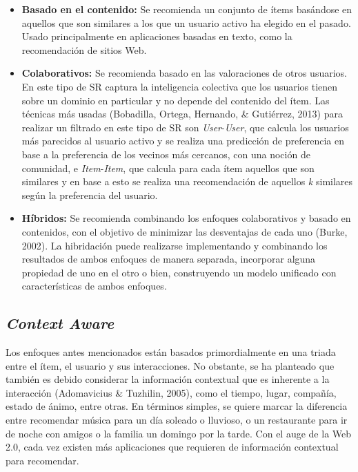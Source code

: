 \begin{itemize}
	\item \textbf{Basado en el contenido:} Se recomienda un conjunto de ítems basándose en aquellos que son similares a los que un usuario activo ha elegido en el pasado. Usado principalmente en aplicaciones basadas en texto, como la recomendación de sitios Web.
	\item \textbf{Colaborativos:} Se recomienda basado en las valoraciones de otros usuarios. En este tipo de SR captura la inteligencia colectiva que los usuarios tienen sobre un dominio en particular y no depende del contenido del ítem. Las técnicas más usadas (Bobadilla, Ortega, Hernando, & Gutiérrez, 2013) para realizar un filtrado en este tipo de SR son \textit{User}-\textit{User}, que calcula los usuarios más parecidos al usuario activo y se realiza una predicción de preferencia en base a la preferencia de los vecinos más cercanos, con una noción de comunidad, e \textit{Item}-\textit{Item}, que calcula para cada ítem aquellos que son similares y en base a esto se realiza una recomendación de aquellos \textit{k} similares según la preferencia del usuario.
	\item \textbf{Híbridos:} Se recomienda combinando los enfoques colaborativos y basado en contenidos, con el objetivo de minimizar las desventajas de cada uno (Burke, 2002). La hibridación puede realizarse implementando y combinando los resultados de ambos enfoques de manera separada, incorporar alguna propiedad de uno en el otro o bien, construyendo un modelo unificado con características de ambos enfoques.
\end{itemize}

\subsection{\textit{Context Aware}}

Los enfoques antes mencionados están basados primordialmente en una triada entre el ítem, el usuario y sus interacciones. No obstante, se ha planteado que también es debido considerar la información contextual que es inherente a la interacción (Adomavicius & Tuzhilin, 2005), como el tiempo, lugar, compañía, estado de ánimo, entre otras. En términos simples, se quiere marcar la diferencia entre recomendar música para un día soleado o lluvioso, o un restaurante para ir de noche con amigos o la familia un domingo por la tarde. Con el auge de la Web 2.0, cada vez existen más aplicaciones que requieren de información contextual para recomendar.

